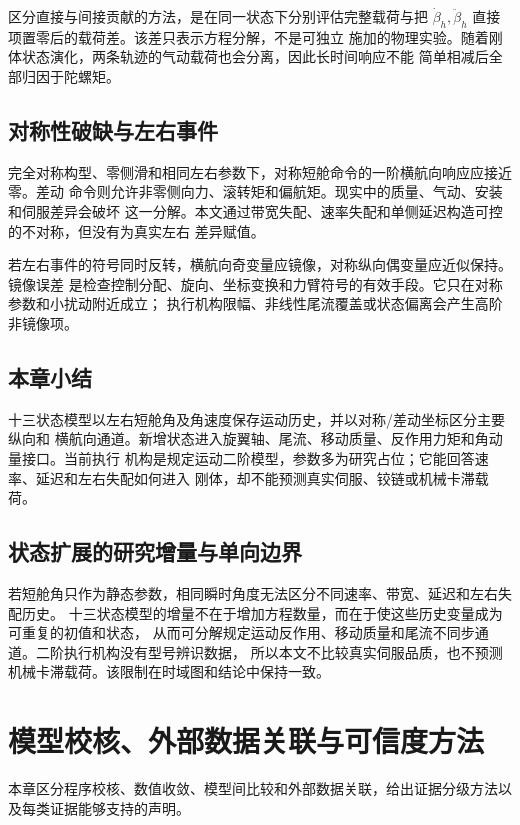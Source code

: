 \documentclass[UTF8,12pt,oneside,openany,fontset=windows]{ctexbook}
\begin{document}
区分直接与间接贡献的方法，是在同一状态下分别评估完整载荷与把 \(\dot\beta_h,\ddot\beta_h\) 直接项置零后的载荷差。该差只表示方程分解，不是可独立 施加的物理实验。随着刚体状态演化，两条轨迹的气动载荷也会分离，因此长时间响应不能 简单相减后全部归因于陀螺矩。

\section{对称性破缺与左右事件}

完全对称构型、零侧滑和相同左右参数下，对称短舱命令的一阶横航向响应应接近零。差动 命令则允许非零侧向力、滚转矩和偏航矩。现实中的质量、气动、安装和伺服差异会破坏 这一分解。本文通过带宽失配、速率失配和单侧延迟构造可控的不对称，但没有为真实左右 差异赋值。

若左右事件的符号同时反转，横航向奇变量应镜像，对称纵向偶变量应近似保持。镜像误差 是检查控制分配、旋向、坐标变换和力臂符号的有效手段。它只在对称参数和小扰动附近成立； 执行机构限幅、非线性尾流覆盖或状态偏离会产生高阶非镜像项。

\section{本章小结}

十三状态模型以左右短舱角及角速度保存运动历史，并以对称/差动坐标区分主要纵向和 横航向通道。新增状态进入旋翼轴、尾流、移动质量、反作用力矩和角动量接口。当前执行 机构是规定运动二阶模型，参数多为研究占位；它能回答速率、延迟和左右失配如何进入 刚体，却不能预测真实伺服、铰链或机械卡滞载荷。

\section{状态扩展的研究增量与单向边界}

若短舱角只作为静态参数，相同瞬时角度无法区分不同速率、带宽、延迟和左右失配历史。 十三状态模型的增量不在于增加方程数量，而在于使这些历史变量成为可重复的初值和状态， 从而可分解规定运动反作用、移动质量和尾流不同步通道。二阶执行机构没有型号辨识数据， 所以本文不比较真实伺服品质，也不预测机械卡滞载荷。该限制在时域图和结论中保持一致。

\chapter{模型校核、外部数据关联与可信度方法}

本章区分程序校核、数值收敛、模型间比较和外部数据关联，给出证据分级方法以及每类证据能够支持的声明。
\end{document}
